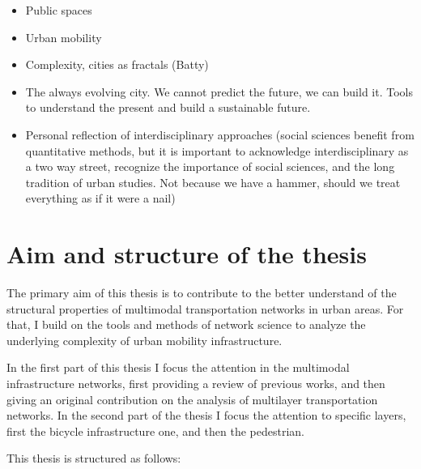 \begin{itemize}
    \item Public spaces
    \item Urban mobility
    \item Complexity, cities as fractals (Batty)
    \item The always evolving city. We cannot predict the future, we can build it. Tools to understand the present and build a sustainable future.
    \item Personal reflection of interdisciplinary approaches (social sciences benefit from quantitative methods, but it is important to acknowledge interdisciplinary as a two way street, recognize the importance of social sciences, and the long tradition of urban studies. Not because we have a hammer, should we treat everything as if it were a nail) 
\end{itemize}


\section{Aim and structure of the thesis}


The primary aim of this thesis is to contribute to the better understand of the structural properties of multimodal transportation networks in urban areas. For that, I build on the tools and methods of network science to analyze the underlying complexity of urban mobility infrastructure. 

In the first part of this thesis I focus the attention in the multimodal infrastructure networks, first providing a review of previous works, and then giving an original contribution on the analysis of multilayer transportation networks. In the second part of the thesis I focus the attention to specific layers, first the bicycle infrastructure one, and then the pedestrian.

This thesis is structured as follows:

